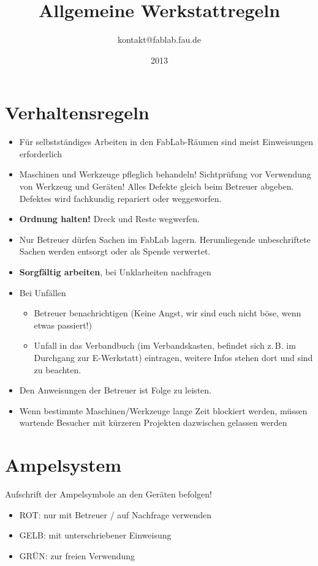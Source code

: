 \documentclass[13pt]{\basedir/fablab-document}
\date{2013}
\author{kontakt@fablab.fau.de}
\title{Allgemeine Werkstattregeln}
\begin{document}
\maketitle

\vbox{\vspace{1cm}}


\section{Verhaltensregeln}
\begin{itemize}
  \item Für selbstständiges Arbeiten in den FabLab-Räumen sind meist Einweisungen erforderlich
  \item Maschinen und Werkzeuge pfleglich behandeln! Sichtprüfung vor Verwendung von Werkzeug und Geräten! Alles Defekte gleich beim Betreuer abgeben. Defektes wird fachkundig repariert oder weggeworfen.
  \item \textbf{Ordnung halten!} Dreck und Reste wegwerfen.
  \item Nur Betreuer dürfen Sachen im FabLab lagern. Herumliegende unbeschriftete Sachen werden entsorgt oder als Spende verwertet. 
  \item \textbf{Sorgfältig arbeiten}, bei Unklarheiten nachfragen
  \item Bei Unfällen
  \begin{itemize}
  	\item Betreuer benachrichtigen (Keine Angst, wir sind euch nicht böse, wenn etwas passiert!)
  	\item Unfall in das Verbandbuch (im Verbandskasten, befindet sich z.\,B. im Durchgang zur E-Werkstatt) eintragen, weitere Infos stehen dort und sind zu beachten.
  \end{itemize} 
  \item Den Anweisungen der Betreuer ist Folge zu leisten.
  \item Wenn bestimmte Maschinen/Werkzeuge lange Zeit blockiert werden, müssen wartende Besucher mit kürzeren Projekten dazwischen gelassen werden
\end{itemize}
\vbox{\vspace{0,5cm}}

\section{Ampelsystem}
Aufschrift der Ampelsymbole an den Geräten befolgen!
\begin{itemize}
 \item ROT: nur mit Betreuer / auf Nachfrage verwenden
 \item GELB: mit unterschriebener Einweisung
 \item GRÜN: zur freien Verwendung
\end{itemize}
\end{document}
